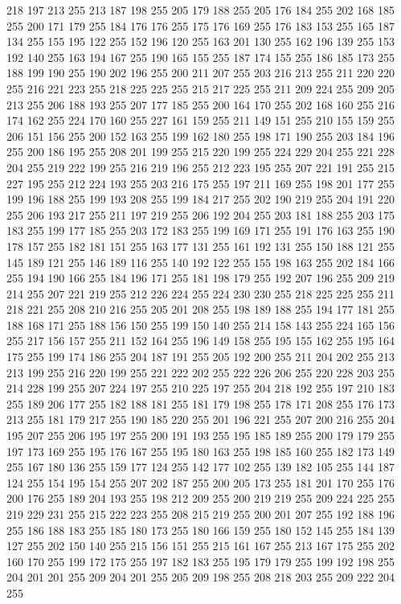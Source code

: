 218 197 213 255 213 187 198 255 205 179 188 255 205 176 184 255 202 168 185 255 200 171 179 255 184 176 176 255 175 176 169 255 176 183 153 255 165 187 134 255 155 195 122 255 152 196 120 255 163 201 130 255 162 196 139 255 153 192 140 255 163 194 167 255
190 165 155 255 187 174 155 255 186 185 173 255 188 199 190 255 190 202 196 255 200 211 207 255 203 216 213 255 211 220 220 255 216 221 223 255 218 225 225 255 215 217 225 255 211 209 224 255 209 205 213 255 206 188 193 255 207 177 185 255 200 164 170 255
202 168 160 255 216 174 162 255 224 170 160 255 227 161 159 255 211 149 151 255 210 155 159 255 206 151 156 255 200 152 163 255 199 162 180 255 198 171 190 255 203 184 196 255 200 186 195 255 208 201 199 255 215 220 199 255 224 229 204 255 221 228 204 255
219 222 199 255 216 219 196 255 212 223 195 255 207 221 191 255 215 227 195 255 212 224 193 255 203 216 175 255 197 211 169 255 198 201 177 255 199 196 188 255 199 193 208 255 199 184 217 255 202 190 219 255 204 191 220 255 206 193 217 255 211 197 219 255
206 192 204 255 203 181 188 255 203 175 183 255 199 177 185 255 203 172 183 255 199 169 171 255 191 176 163 255 190 178 157 255 182 181 151 255 163 177 131 255 161 192 131 255 150 188 121 255 145 189 121 255 146 189 116 255 140 192 122 255 155 198 163 255
202 184 166 255 194 190 166 255 184 196 171 255 181 198 179 255 192 207 196 255 209 219 214 255 207 221 219 255 212 226 224 255 224 230 230 255 218 225 225 255 211 218 221 255 208 210 216 255 205 201 208 255 198 189 188 255 194 177 181 255 188 168 171 255
188 156 150 255 199 150 140 255 214 158 143 255 224 165 156 255 217 156 157 255 211 152 164 255 196 149 158 255 195 155 162 255 195 164 175 255 199 174 186 255 204 187 191 255 205 192 200 255 211 204 202 255 213 213 199 255 216 220 199 255 221 222 202 255
222 226 206 255 220 228 203 255 214 228 199 255 207 224 197 255 210 225 197 255 204 218 192 255 197 210 183 255 189 206 177 255 182 188 181 255 181 179 198 255 178 171 208 255 176 173 213 255 181 179 217 255 190 185 220 255 201 196 221 255 207 200 216 255
204 195 207 255 206 195 197 255 200 191 193 255 195 185 189 255 200 179 179 255 197 173 169 255 195 176 167 255 195 180 163 255 198 185 160 255 182 173 149 255 167 180 136 255 159 177 124 255 142 177 102 255 139 182 105 255 144 187 124 255 154 195 154 255
207 202 187 255 200 205 173 255 181 201 170 255 176 200 176 255 189 204 193 255 198 212 209 255 200 219 219 255 209 224 225 255 219 229 231 255 215 222 223 255 208 215 219 255 200 201 207 255 192 188 196 255 186 188 183 255 185 180 173 255 180 166 159 255
180 152 145 255 184 139 127 255 202 150 140 255 215 156 151 255 215 161 167 255 213 167 175 255 202 160 170 255 199 172 175 255 197 182 183 255 195 179 179 255 199 192 198 255 204 201 201 255 209 204 201 255 205 209 198 255 208 218 203 255 209 222 204 255
